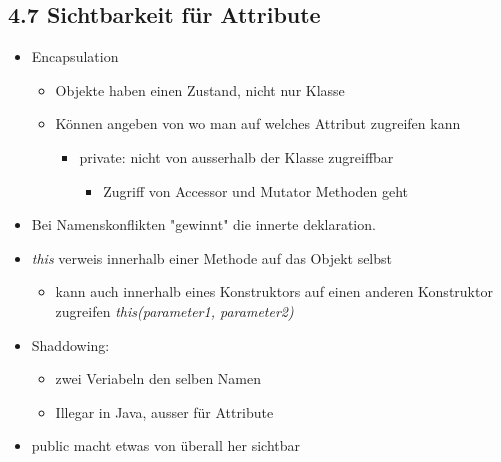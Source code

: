 \documentclass[11pt]{article}
\begin{document}
\subsection{4.7 Sichtbarkeit für Attribute}
\label{sec:org8ec9ef0}
\begin{itemize}
\item Encapsulation\\
\begin{itemize}
\item Objekte haben einen Zustand, nicht nur Klasse\\
\item Können angeben von wo man auf welches Attribut zugreifen kann\\
\begin{itemize}
\item private: nicht von ausserhalb der Klasse zugreiffbar\\
\begin{itemize}
\item Zugriff von Accessor und Mutator Methoden geht\\
\end{itemize}
\end{itemize}
\end{itemize}
\item Bei Namenskonflikten "gewinnt" die innerte deklaration.\\
\item \emph{this} verweis innerhalb einer Methode auf das Objekt selbst\\
\begin{itemize}
\item kann auch innerhalb eines Konstruktors auf einen anderen Konstruktor zugreifen \emph{this(parameter1, parameter2)}\\
\end{itemize}

\item Shaddowing:\\
\begin{itemize}
\item zwei Veriabeln den selben Namen\\
\item Illegar in Java, ausser für Attribute\\
\end{itemize}

\item public macht etwas von überall her sichtbar\\
\end{itemize}
\end{document}
